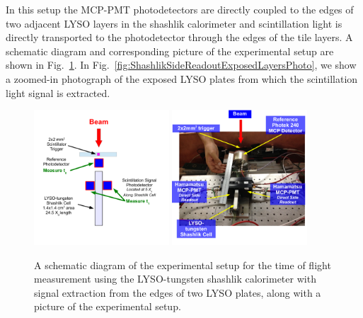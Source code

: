 In this setup the MCP-PMT photodetectors are directly coupled to the edges of two adjacent LYSO layers in the shashlik
calorimeter and scintillation light is directly transported to the photodetector
through the edges of the tile layers. A schematic diagram and corresponding
picture  of the experimental setup are shown in
Fig.~\ref{fig:ShashlikSideReadoutSetup}. In
Fig.~\ref{fig:ShashlikSideReadoutExposedLayersPhoto}, we show a zoomed-in
photograph of the exposed LYSO plates from which the scintillation light signal
is extracted.

\begin{figure}[H] \centering
\includegraphics[width=0.45\textwidth]{figs/timing/ShashlikSideReadoutSetupSchematic} 
\includegraphics[width=0.45\textwidth]{figs/timing/ShashlikSideReadoutPhotoB} 
\caption{A schematic diagram of the experimental setup for the
time of flight measurement using the LYSO-tungsten shashlik calorimeter
with signal extraction from the edges of two LYSO plates, along
with a picture of the experimental setup. } 
\label{fig:ShashlikSideReadoutSetup}
\end{figure}

